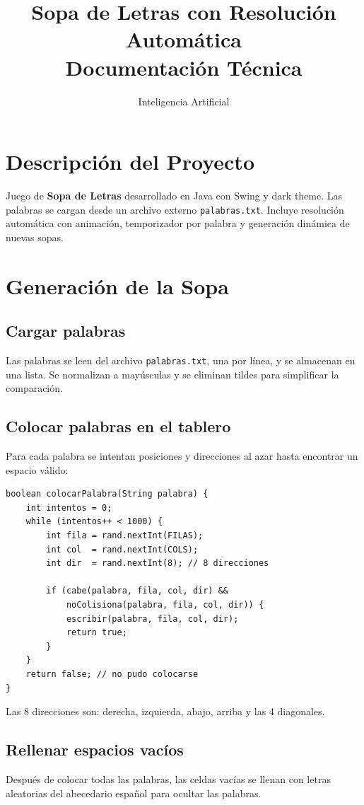 \documentclass[12pt,a4paper]{article}
\title{\textbf{Sopa de Letras con Resolución Automática}\\
  \large Documentación Técnica}
\author{Inteligencia Artificial}
\date{}
\begin{document}
\maketitle
\tableofcontents
\newpage

\section{Descripción del Proyecto}
Juego de \textbf{Sopa de Letras} desarrollado en Java con Swing y dark theme. Las palabras se cargan desde un archivo externo \texttt{palabras.txt}. Incluye resolución automática con animación, temporizador por palabra y generación dinámica de nuevas sopas.

\section{Generación de la Sopa}

\subsection{Cargar palabras}
Las palabras se leen del archivo \texttt{palabras.txt}, una por línea, y se almacenan en una lista. Se normalizan a mayúsculas y se eliminan tildes para simplificar la comparación.

\subsection{Colocar palabras en el tablero}
Para cada palabra se intentan posiciones y direcciones al azar hasta encontrar un espacio válido:

\begin{lstlisting}
boolean colocarPalabra(String palabra) {
    int intentos = 0;
    while (intentos++ < 1000) {
        int fila = rand.nextInt(FILAS);
        int col  = rand.nextInt(COLS);
        int dir  = rand.nextInt(8); // 8 direcciones

        if (cabe(palabra, fila, col, dir) &&
            noColisiona(palabra, fila, col, dir)) {
            escribir(palabra, fila, col, dir);
            return true;
        }
    }
    return false; // no pudo colocarse
}
\end{lstlisting}

Las 8 direcciones son: derecha, izquierda, abajo, arriba y las 4 diagonales.

\subsection{Rellenar espacios vacíos}
Después de colocar todas las palabras, las celdas vacías se llenan con letras aleatorias del abecedario español para ocultar las palabras.
\end{document}
